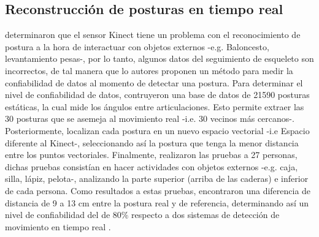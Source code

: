 \subsection{Reconstrucci\'on de posturas en tiempo real} \label{tr:2}
 determinaron que el sensor Kinect tiene un problema con el reconocimiento de postura a la hora de interactuar con objetos externos -e.g. Baloncesto, levantamiento pesas-, por lo tanto, algunos datos del seguimiento de esqueleto son incorrectos, de tal manera que lo autores proponen un m\'etodo para medir la confiabilidad de datos al momento de detectar una postura.
\medbreak
Para determinar el nivel de confiabilidad de datos,  contruyeron una base de datos de 21590 posturas est\'aticas, la cual mide los \'angulos entre articulaciones. Esto permite  extraer las 30 posturas que se asemeja al movimiento real -i.e. 30 vecinos m\'as cercanos-.  Posteriormente, localizan cada postura en un nuevo espacio vectorial -i.e Espacio diferente al Kinect-, seleccionando as\'i la postura que tenga la menor distancia entre los puntos vectoriales.
\medbreak
Finalmente,  realizaron las pruebas a 27 personas, dichas pruebas consist\'ian en hacer actividades con objetos externos -e.g. caja, silla, l\'apiz, pelota-, analizando la parte superior (arriba de las caderas) e inferior de cada persona. Como resultados a estas pruebas, encontraron una diferencia de distancia de 9 a 13 cm entre la postura real y de referencia, determinando as\'i un nivel de confiabilidad del de 80\% respecto a dos sistemas de detecci\'on de movimiento en tiempo real \cite{shum2011fast,shum2012real}.
